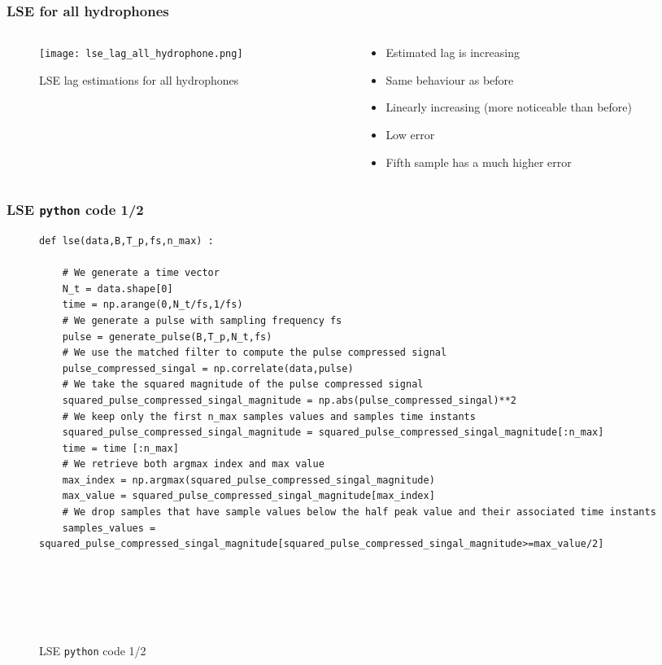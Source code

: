 \documentclass[UKenglish,8pt,aspectratio=1610]{beamer}
\begin{document}
\begin{frame}
	\frametitle{LSE for all hydrophones}
	\begin{columns}
	\begin{column}{0.5\textwidth}
		\vspace{-25pt}
		\begin{figure}[h!]
			\texttt{[image: lse\_lag\_all\_hydrophone.png]}
			\centering
			\caption{LSE lag estimations for all hydrophones}
		\end{figure}
	\end{column}
	\begin{column}{0.5\textwidth}
		\begin{itemize}
			\item Estimated lag is increasing  
			\item Same behaviour as before 
			\item Linearly increasing (more noticeable than before)
			\item Low error 
			\item Fifth sample has a much higher error 
		\end{itemize}
	\end{column}
\end{columns} 
\end{frame}

\begin{frame}[fragile]
	\frametitle{LSE \texttt{python} code 1/2}
\begin{figure}
\begin{lstlisting}[language=PythonPlus,style=colorEX]
def lse(data,B,T_p,fs,n_max) :
	
	# We generate a time vector
	N_t = data.shape[0]
	time = np.arange(0,N_t/fs,1/fs)
	# We generate a pulse with sampling frequency fs    
	pulse = generate_pulse(B,T_p,N_t,fs)
	# We use the matched filter to compute the pulse compressed signal
	pulse_compressed_singal = np.correlate(data,pulse)
	# We take the squared magnitude of the pulse compressed signal
	squared_pulse_compressed_singal_magnitude = np.abs(pulse_compressed_singal)**2
	# We keep only the first n_max samples values and samples time instants
	squared_pulse_compressed_singal_magnitude = squared_pulse_compressed_singal_magnitude[:n_max]
	time = time [:n_max]
	# We retrieve both argmax index and max value
	max_index = np.argmax(squared_pulse_compressed_singal_magnitude)
	max_value = squared_pulse_compressed_singal_magnitude[max_index]
	# We drop samples that have sample values below the half peak value and their associated time instants
	samples_values = squared_pulse_compressed_singal_magnitude[squared_pulse_compressed_singal_magnitude>=max_value/2]
	
	
	
	
	
\end{lstlisting}
\caption{LSE \texttt{python} code 1/2}
\end{figure}
\end{frame}
\end{document}
